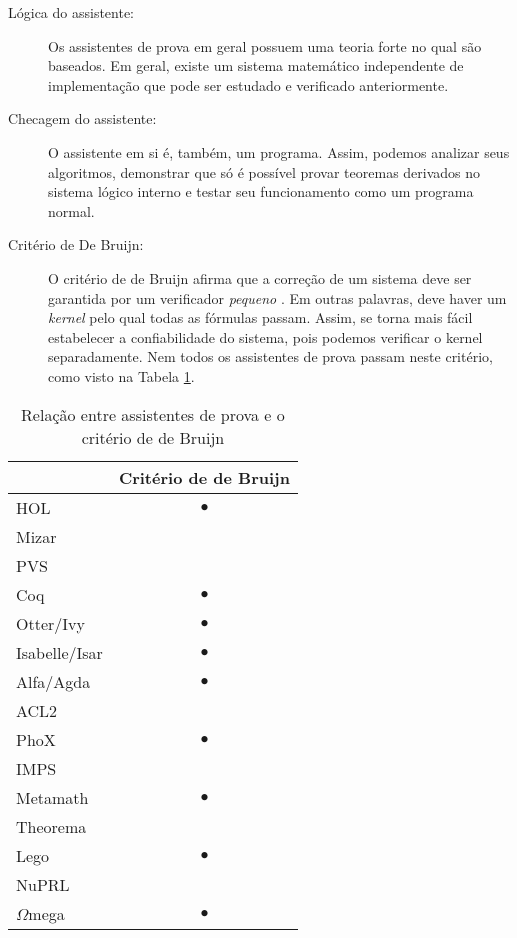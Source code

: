 \begin{description}
    \item[Lógica do assistente:] Os assistentes de prova em geral possuem uma
        teoria forte no qual são baseados. Em geral, existe um sistema
        matemático independente de implementação que pode ser estudado e
        verificado anteriormente.
    \item[Checagem do assistente:] O assistente em si é, também, um programa. Assim,
        podemos analizar seus algoritmos, demonstrar que só é possível provar
        teoremas derivados no sistema lógico interno e testar seu funcionamento
        como um programa normal.
    \item[Critério de De Bruijn:] O critério de de Bruijn afirma que a correção
        de um sistema deve ser garantida por um verificador \emph{pequeno}
        \cite{freek}. Em outras palavras, deve haver um \emph{kernel} pelo qual
        todas as fórmulas passam. Assim, se torna mais fácil estabelecer a
        confiabilidade do sistema, pois podemos verificar o kernel
        separadamente. Nem todos os assistentes de prova passam neste critério,
        como visto na Tabela \ref{table:dbj_crit}.
\end{description}

\begin{table}[h]
\centering
\caption{Relação entre assistentes de prova e o critério de de Bruijn \cite{freek}}
\label{table:dbj_crit}
\begin{tabular}{l|c}
              & \multicolumn{1}{l}{Critério de de Bruijn} \\ \hline
HOL           & $\bullet$                                 \\
Mizar         & \multicolumn{1}{l}{}                      \\
PVS           & \multicolumn{1}{l}{}                      \\ 
Coq           & $\bullet$                                 \\
Otter/Ivy     & $\bullet$                                 \\
Isabelle/Isar & $\bullet$                                 \\
Alfa/Agda     & $\bullet$                                 \\
ACL2          &                                           \\
PhoX          & $\bullet$                                 \\
IMPS          &                                           \\
Metamath      & $\bullet$                                 \\
Theorema      &                                           \\
Lego          & $\bullet$                                 \\
NuPRL         &                                           \\
$\Omega$mega  & $\bullet$                                        
\end{tabular}
\end{table}


